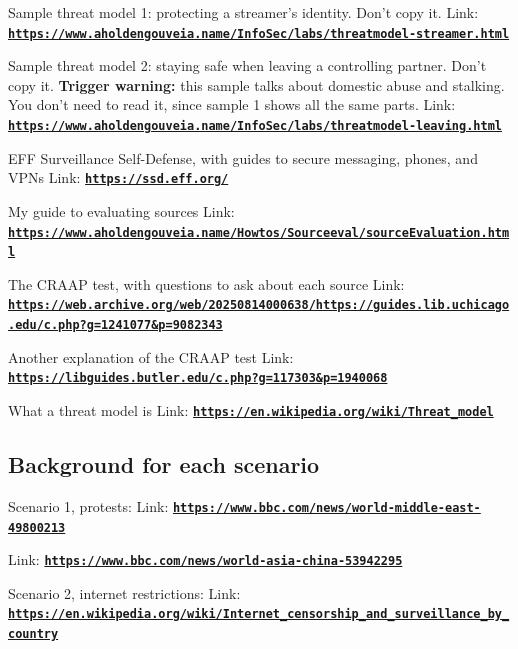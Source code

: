 \documentclass[12pt]{article}
\begin{document}
Sample threat model 1: protecting a streamer's identity. Don't copy it.
Link: \href{https://www.aholdengouveia.name/InfoSec/labs/threatmodel-streamer.html}{\textbf{\nolinkurl{https://www.aholdengouveia.name/InfoSec/labs/threatmodel-streamer.html}}}

Sample threat model 2: staying safe when leaving a controlling partner. Don't copy it. \textbf{Trigger warning:} this sample talks about domestic abuse and stalking. You don't need to read it, since sample 1 shows all the same parts.
Link: \href{https://www.aholdengouveia.name/InfoSec/labs/threatmodel-leaving.html}{\textbf{\nolinkurl{https://www.aholdengouveia.name/InfoSec/labs/threatmodel-leaving.html}}}

EFF Surveillance Self-Defense, with guides to secure messaging, phones, and VPNs
Link: \href{https://ssd.eff.org/}{\textbf{\nolinkurl{https://ssd.eff.org/}}}

My guide to evaluating sources
Link: \href{https://www.aholdengouveia.name/Howtos/Sourceeval/sourceEvaluation.html}{\textbf{\nolinkurl{https://www.aholdengouveia.name/Howtos/Sourceeval/sourceEvaluation.html}}}

The CRAAP test, with questions to ask about each source
Link: \href{https://web.archive.org/web/20250814000638/https://guides.lib.uchicago.edu/c.php?g=1241077&p=9082343}{\textbf{\nolinkurl{https://web.archive.org/web/20250814000638/https://guides.lib.uchicago.edu/c.php?g=1241077&p=9082343}}}

Another explanation of the CRAAP test
Link: \href{https://libguides.butler.edu/c.php?g=117303&p=1940068}{\textbf{\nolinkurl{https://libguides.butler.edu/c.php?g=117303&p=1940068}}}

What a threat model is
Link: \href{https://en.wikipedia.org/wiki/Threat_model}{\textbf{\nolinkurl{https://en.wikipedia.org/wiki/Threat_model}}}

\subsection*{Background for each scenario}
Scenario 1, protests:
Link: \href{https://www.bbc.com/news/world-middle-east-49800213}{\textbf{\nolinkurl{https://www.bbc.com/news/world-middle-east-49800213}}}

Link: \href{https://www.bbc.com/news/world-asia-china-53942295}{\textbf{\nolinkurl{https://www.bbc.com/news/world-asia-china-53942295}}}

Scenario 2, internet restrictions:
Link: \href{https://en.wikipedia.org/wiki/Internet_censorship_and_surveillance_by_country}{\textbf{\nolinkurl{https://en.wikipedia.org/wiki/Internet_censorship_and_surveillance_by_country}}}
\end{document}
